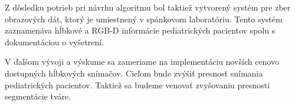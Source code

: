 Z dôsledku potrieb pri návrhu algoritmu bol taktiež vytvorený systém pre zber obrazových dát, ktorý je umiestnený v spánkovom laboratóriu. Tento systém zaznamenáva hĺbkové a RGB-D informácie pediatrických pacientov spolu s dokumentáciou o vyšetrení. 

V ďalšom vývoji a výskume sa zameriame na implementáciu novších cenovo dostupných hĺbkových snímačov. Cieľom bude zvýšiť presnosť snímania pediatrických pacientov. Taktiež sa budeme venovať zvyšovaniu presnosti segmentácie tváre. 
